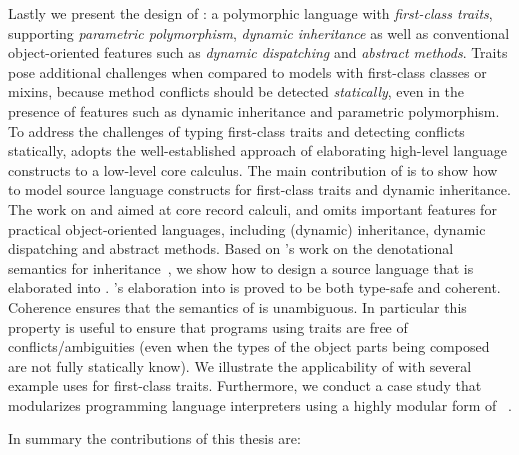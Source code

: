 Lastly we present the design of \sedel: a polymorphic language with
\emph{first-class traits}, supporting \emph{parametric polymorphism}, \emph{dynamic inheritance} as well as
conventional object-oriented features such as \emph{dynamic dispatching} and \emph{abstract
  methods}. Traits pose additional challenges when compared to models with
first-class classes or mixins, because method conflicts should be detected
\emph{statically}, even in the presence of features such as dynamic inheritance and
parametric polymorphism. To address the challenges of
typing first-class traits and detecting conflicts statically, \sedel adopts the
well-established approach of elaborating high-level language constructs to a
low-level core calculus. The main contribution of \sedel is to show how to model
source language constructs for first-class traits and dynamic inheritance. The
work on \namee and \fnamee aimed at core record calculi, and omits important
features for practical object-oriented languages, including (dynamic) inheritance, dynamic
dispatching and abstract methods. Based on \citeauthor{cookthesis}'s
work on the denotational semantics for inheritance~\citep{cook1989denotational, cookthesis},
we show how to design a source language that is elaborated into \fnamee.
\sedel's elaboration into \fnamee is proved to be both type-safe and coherent.
Coherence ensures that the semantics of \sedel is unambiguous. In particular
this property is useful to ensure that programs using traits are free of
conflicts/ambiguities (even when the types of the object parts being composed
are not fully statically know). We illustrate the applicability of \sedel with
several example uses for first-class traits. Furthermore, we conduct a case study
that modularizes programming language interpreters using a highly modular form
of \visitor~\citep{oliveira09modular, togersen:2004}.

In summary the contributions of this thesis are:


